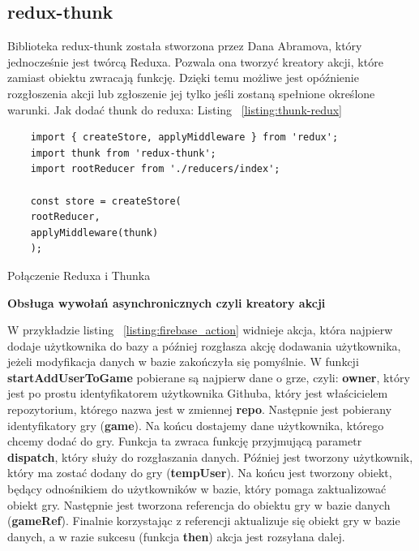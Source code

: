 \subsection{redux-thunk}

Biblioteka redux-thunk została stworzona przez Dana Abramova,
który jednocześnie jest twórcą Reduxa. Pozwala ona tworzyć kreatory akcji,
które zamiast obiektu zwracają funkcję.
Dzięki temu możliwe jest opóźnienie rozgłoszenia akcji lub zgłoszenie jej tylko jeśli zostaną spełnione określone warunki.\cite{www_thunk}
Jak dodać thunk do reduxa: Listing 
~\ref{listing:thunk-redux}

\begin{listing}
	\begin{verbatim}
	import { createStore, applyMiddleware } from 'redux';
	import thunk from 'redux-thunk';
	import rootReducer from './reducers/index';
	
	const store = createStore(
	rootReducer,
	applyMiddleware(thunk)
	);
	\end{verbatim}
	\caption{Połączenie Reduxa i Thunka} \label{listing:thunk-redux}
\end{listing}

\newpage

\begin{center}
	\textbf{Obsługa wywołań asynchronicznych czyli kreatory akcji}
\end{center}

W przykładzie listing 
~\ref{listing:firebase_action} widnieje akcja,
która najpierw dodaje użytkownika do bazy a później rozgłasza akcję dodawania użytkownika,
jeżeli modyfikacja danych w bazie zakończyła się pomyślnie.
W funkcji \textbf{startAddUserToGame} pobierane są najpierw dane o grze, czyli: \textbf{owner},
który jest po prostu identyfikatorem użytkownika Githuba,
który jest właścicielem repozytorium, którego nazwa jest w zmiennej \textbf{repo}.
Następnie jest pobierany identyfikatory gry (\textbf{game}).
Na końcu dostajemy dane użytkownika, którego chcemy dodać do gry.
Funkcja ta zwraca funkcję przyjmującą parametr \textbf{dispatch},
który służy do rozgłaszania danych.
Później jest tworzony użytkownik, który ma zostać dodany do gry (\textbf{tempUser}).
Na końcu jest tworzony obiekt, będący odnośnikiem do użytkowników w bazie,
który pomaga zaktualizować obiekt gry.
Następnie jest tworzona referencja do obiektu gry w bazie danych (\textbf{gameRef}).
Finalnie korzystając z referencji aktualizuje się obiekt gry w bazie danych,
 a w razie sukcesu (funkcja \textbf{then}) akcja jest rozsyłana dalej.

